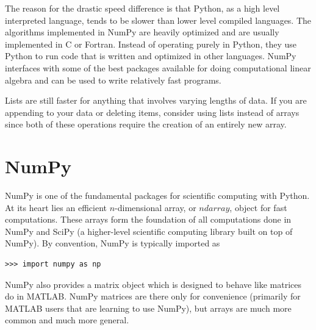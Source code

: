 %

The reason for the drastic speed difference is that Python, as a high level interpreted language, tends to be slower than lower level compiled languages.
The algorithms implemented in NumPy are heavily optimized and are usually implemented in C or Fortran.
Instead of operating purely in Python, they use Python to run code that is written and optimized in other languages.
NumPy interfaces with some of the best packages available for doing computational linear algebra and can be used to write relatively fast programs.

Lists are still faster for anything that involves varying lengths of data.
If you are appending to your data or deleting items, consider using lists instead of arrays since both of these operations require the creation of an entirely new array.

\section*{NumPy}
NumPy is one of the fundamental packages for scientific computing with Python.
At its heart lies an efficient $n$-dimensional array, or $ndarray$, object for fast computations.
These arrays form the foundation of all computations done in NumPy and SciPy (a higher-level scientific computing library built on top of NumPy).
By convention, NumPy is typically imported as
\begin{lstlisting}
>>> import numpy as np
\end{lstlisting}
NumPy also provides a matrix object which is designed to behave like matrices do in MATLAB.
NumPy matrices are there only for convenience (primarily for MATLAB users that are learning to use NumPy), but arrays are much more common and much more general.

